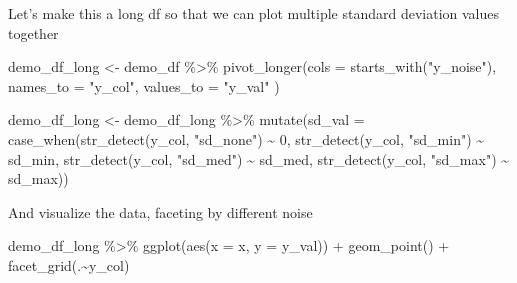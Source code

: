 \documentclass[
]{book}
\newenvironment{Shaded}{\begin{snugshade}}{\end{snugshade}}
\newcommand{\AttributeTok}[1]{\textcolor[rgb]{0.77,0.63,0.00}{#1}}
\newcommand{\DecValTok}[1]{\textcolor[rgb]{0.00,0.00,0.81}{#1}}
\newcommand{\FunctionTok}[1]{\textcolor[rgb]{0.00,0.00,0.00}{#1}}
\newcommand{\NormalTok}[1]{#1}
\newcommand{\OtherTok}[1]{\textcolor[rgb]{0.56,0.35,0.01}{#1}}
\newcommand{\SpecialCharTok}[1]{\textcolor[rgb]{0.00,0.00,0.00}{#1}}
\newcommand{\StringTok}[1]{\textcolor[rgb]{0.31,0.60,0.02}{#1}}
\begin{document}
Let's make this a long df so that we can plot multiple standard deviation values together

\begin{Shaded}
\begin{Highlighting}[]
\NormalTok{demo\_df\_long }\OtherTok{\textless{}{-}}\NormalTok{ demo\_df }\SpecialCharTok{\%\textgreater{}\%} 
  \FunctionTok{pivot\_longer}\NormalTok{(}\AttributeTok{cols =} \FunctionTok{starts\_with}\NormalTok{(}\StringTok{"y\_noise"}\NormalTok{),}
               \AttributeTok{names\_to =} \StringTok{"y\_col"}\NormalTok{,}
               \AttributeTok{values\_to =} \StringTok{"y\_val"}
\NormalTok{  )}
\end{Highlighting}
\end{Shaded}

\begin{Shaded}
\begin{Highlighting}[]
\NormalTok{demo\_df\_long }\OtherTok{\textless{}{-}}\NormalTok{ demo\_df\_long }\SpecialCharTok{\%\textgreater{}\%} 
  \FunctionTok{mutate}\NormalTok{(}\AttributeTok{sd\_val =} \FunctionTok{case\_when}\NormalTok{(}\FunctionTok{str\_detect}\NormalTok{(y\_col, }\StringTok{"sd\_none"}\NormalTok{) }\SpecialCharTok{\textasciitilde{}} \DecValTok{0}\NormalTok{,}
                            \FunctionTok{str\_detect}\NormalTok{(y\_col, }\StringTok{"sd\_min"}\NormalTok{) }\SpecialCharTok{\textasciitilde{}}\NormalTok{ sd\_min,}
                            \FunctionTok{str\_detect}\NormalTok{(y\_col, }\StringTok{"sd\_med"}\NormalTok{) }\SpecialCharTok{\textasciitilde{}}\NormalTok{ sd\_med,}
                            \FunctionTok{str\_detect}\NormalTok{(y\_col, }\StringTok{"sd\_max"}\NormalTok{) }\SpecialCharTok{\textasciitilde{}}\NormalTok{ sd\_max))}
\end{Highlighting}
\end{Shaded}

And visualize the data, faceting by different noise

\begin{Shaded}
\begin{Highlighting}[]
\NormalTok{demo\_df\_long }\SpecialCharTok{\%\textgreater{}\%} 
  \FunctionTok{ggplot}\NormalTok{(}\FunctionTok{aes}\NormalTok{(}\AttributeTok{x =}\NormalTok{ x, }\AttributeTok{y =}\NormalTok{ y\_val)) }\SpecialCharTok{+}
  \FunctionTok{geom\_point}\NormalTok{() }\SpecialCharTok{+}
  \FunctionTok{facet\_grid}\NormalTok{(.}\SpecialCharTok{\textasciitilde{}}\NormalTok{y\_col)}
\end{Highlighting}
\end{Shaded}
\end{document}
